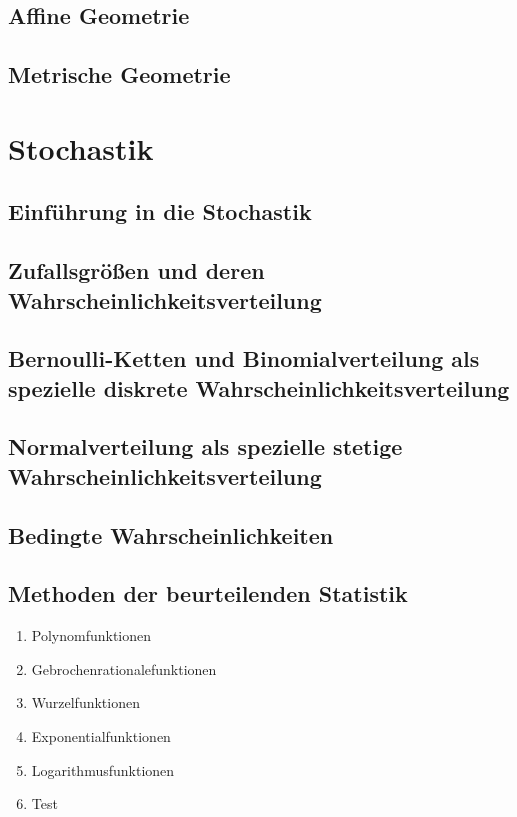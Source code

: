 \documentclass{article}
\begin{document}
\subsection{Affine Geometrie}
\subsection{Metrische Geometrie}

\section{Stochastik}
\subsection{Einführung in die Stochastik}
\subsection{Zufallsgrößen und deren Wahrscheinlichkeitsverteilung}
\subsection{Bernoulli-Ketten und Binomialverteilung als spezielle diskrete Wahrscheinlichkeitsverteilung}
\subsection{Normalverteilung als spezielle stetige Wahrscheinlichkeitsverteilung}
\subsection{Bedingte Wahrscheinlichkeiten}
\subsection{Methoden der beurteilenden Statistik}


\begin{enumerate}
    \item Polynomfunktionen
    \item Gebrochenrationalefunktionen
    \item Wurzelfunktionen
    \item Exponentialfunktionen
    \item Logarithmusfunktionen
    \item Test
\end{enumerate}
\end{document}
